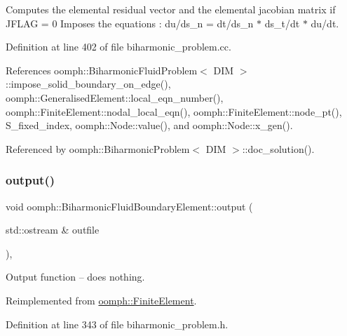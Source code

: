 Computes the elemental residual vector and the elemental jacobian matrix if J\+F\+L\+AG = 0 Imposes the equations \+: du/ds\+\_\+n = dt/ds\+\_\+n $\ast$ ds\+\_\+t/dt $\ast$ du/dt. 



Definition at line 402 of file biharmonic\+\_\+problem.\+cc.



References oomph\+::\+Biharmonic\+Fluid\+Problem$<$ D\+I\+M $>$\+::impose\+\_\+solid\+\_\+boundary\+\_\+on\+\_\+edge(), oomph\+::\+Generalised\+Element\+::local\+\_\+eqn\+\_\+number(), oomph\+::\+Finite\+Element\+::nodal\+\_\+local\+\_\+eqn(), oomph\+::\+Finite\+Element\+::node\+\_\+pt(), S\+\_\+fixed\+\_\+index, oomph\+::\+Node\+::value(), and oomph\+::\+Node\+::x\+\_\+gen().



Referenced by oomph\+::\+Biharmonic\+Problem$<$ D\+I\+M $>$\+::doc\+\_\+solution().

\mbox{\label{classoomph_1_1BiharmonicFluidBoundaryElement_a20586e08a9a747f2165b9e2eeb62a4dc}} 
\subsubsection{\texorpdfstring{output()}{output()}\hspace{0.1cm}{\footnotesize\ttfamily [1/4]}}
{\footnotesize\ttfamily void oomph\+::\+Biharmonic\+Fluid\+Boundary\+Element\+::output (\begin{DoxyParamCaption}\item[{std\+::ostream \&}]{outfile }\end{DoxyParamCaption})\hspace{0.3cm}{\ttfamily [inline]}, {\ttfamily [virtual]}}



Output function -- does nothing. 



Reimplemented from \hyperlink{classoomph_1_1FiniteElement_a2ad98a3d2ef4999f1bef62c0ff13f2a7}{oomph\+::\+Finite\+Element}.



Definition at line 343 of file biharmonic\+\_\+problem.\+h.

